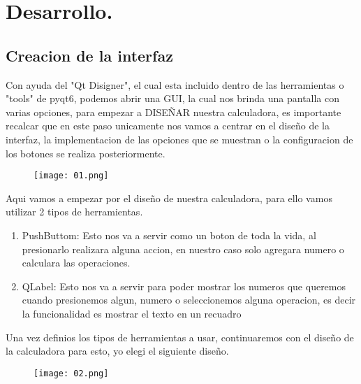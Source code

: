 \documentclass[11pt]{article}
\begin{document}
\section{Desarrollo.}


\subsection{Creacion de la interfaz}
Con ayuda del "Qt Disigner", el cual esta incluido dentro de las herramientas o "tools" de pyqt6, podemos  abrir una GUI, la cual nos brinda una pantalla con varias opciones, para empezar a DISEÑAR nuestra calculadora, es importante recalcar que en este paso unicamente nos vamos a centrar en el diseño de la interfaz, la implementacion de las opciones que se muestran o la configuracion de los botones se realiza posteriormente. 


\begin{figure}[H]
		\begin{center}
 			\texttt{[image: 01.png]}
 			
		\end{center} 
\end{figure}

Aqui vamos a empezar por el diseño de nuestra calculadora, para ello vamos utilizar 2 tipos de herramientas.
\begin{enumerate}
\item PushButtom: Esto nos va a servir como un boton de toda la vida, al presionarlo realizara alguna accion, en nuestro caso solo agregara numero o calculara las operaciones.
\item QLabel: Esto nos va a servir para poder mostrar los numeros que queremos cuando presionemos algun, numero o seleccionemos alguna operacion, es decir la funcionalidad es mostrar el texto en un recuadro
\end{enumerate}

Una vez definios los tipos de herramientas a usar, continuaremos con el diseño de la calculadora para esto, yo elegi el siguiente diseño.

\begin{figure}[H]
		\begin{center}
 			\texttt{[image: 02.png]}
 			
		\end{center} 
\end{figure}
\end{document}
